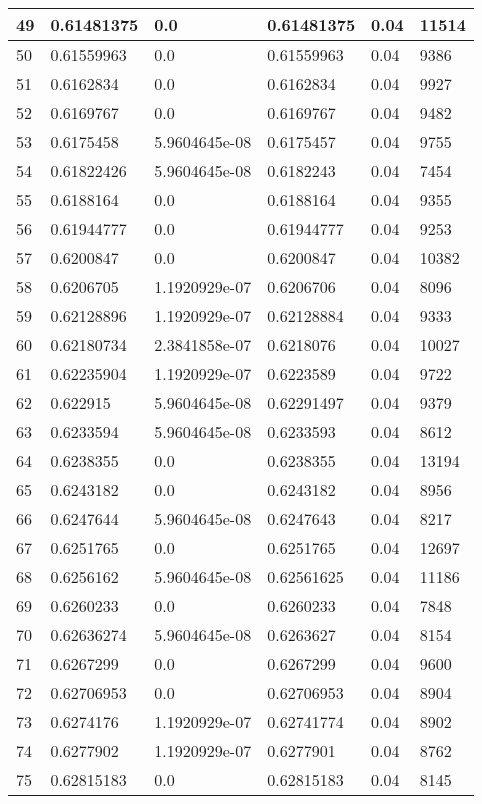\begin{longtable}{|l|l|l|l|l|l|}
49 & 0.61481375 & 0.0 & 0.61481375 & 0.04 & 11514 \\ \hline 
50 & 0.61559963 & 0.0 & 0.61559963 & 0.04 & 9386 \\ \hline 
51 & 0.6162834 & 0.0 & 0.6162834 & 0.04 & 9927 \\ \hline 
52 & 0.6169767 & 0.0 & 0.6169767 & 0.04 & 9482 \\ \hline 
53 & 0.6175458 & 5.9604645e-08 & 0.6175457 & 0.04 & 9755 \\ \hline 
54 & 0.61822426 & 5.9604645e-08 & 0.6182243 & 0.04 & 7454 \\ \hline 
55 & 0.6188164 & 0.0 & 0.6188164 & 0.04 & 9355 \\ \hline 
56 & 0.61944777 & 0.0 & 0.61944777 & 0.04 & 9253 \\ \hline 
57 & 0.6200847 & 0.0 & 0.6200847 & 0.04 & 10382 \\ \hline 
58 & 0.6206705 & 1.1920929e-07 & 0.6206706 & 0.04 & 8096 \\ \hline 
59 & 0.62128896 & 1.1920929e-07 & 0.62128884 & 0.04 & 9333 \\ \hline 
60 & 0.62180734 & 2.3841858e-07 & 0.6218076 & 0.04 & 10027 \\ \hline 
61 & 0.62235904 & 1.1920929e-07 & 0.6223589 & 0.04 & 9722 \\ \hline 
62 & 0.622915 & 5.9604645e-08 & 0.62291497 & 0.04 & 9379 \\ \hline 
63 & 0.6233594 & 5.9604645e-08 & 0.6233593 & 0.04 & 8612 \\ \hline 
64 & 0.6238355 & 0.0 & 0.6238355 & 0.04 & 13194 \\ \hline 
65 & 0.6243182 & 0.0 & 0.6243182 & 0.04 & 8956 \\ \hline 
66 & 0.6247644 & 5.9604645e-08 & 0.6247643 & 0.04 & 8217 \\ \hline 
67 & 0.6251765 & 0.0 & 0.6251765 & 0.04 & 12697 \\ \hline 
68 & 0.6256162 & 5.9604645e-08 & 0.62561625 & 0.04 & 11186 \\ \hline 
69 & 0.6260233 & 0.0 & 0.6260233 & 0.04 & 7848 \\ \hline 
70 & 0.62636274 & 5.9604645e-08 & 0.6263627 & 0.04 & 8154 \\ \hline 
71 & 0.6267299 & 0.0 & 0.6267299 & 0.04 & 9600 \\ \hline 
72 & 0.62706953 & 0.0 & 0.62706953 & 0.04 & 8904 \\ \hline 
73 & 0.6274176 & 1.1920929e-07 & 0.62741774 & 0.04 & 8902 \\ \hline 
74 & 0.6277902 & 1.1920929e-07 & 0.6277901 & 0.04 & 8762 \\ \hline 
75 & 0.62815183 & 0.0 & 0.62815183 & 0.04 & 8145 \\ \hline 
\end{longtable}